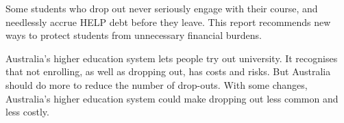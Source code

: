 \begin{overview}
Some students who drop out never seriously engage with their course, and needlessly accrue HELP debt before they leave. This report recommends new ways to protect students from unnecessary financial burdens.

Australia’s higher education system lets people try out university. It recognises that not enrolling, as well as dropping out, has costs and risks. But Australia should do more to reduce the number of drop-outs. With some changes, Australia’s higher education system could make dropping out less common and less costly. 


\end{overview}